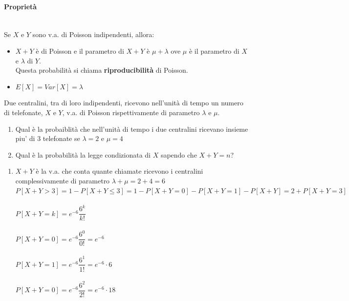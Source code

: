 \documentclass[12pt]{report}
\newcounter{exercise}
\begin{document}
  	 \paragraph{Proprietà} \quad \\
  	 Se $X$ e $Y$ sono v.a. di Poisson indipendenti, allora:
  	 \begin{itemize}
  	 	\item $X + Y$ è di Poisson e il parametro di $X + Y$ è $\mu + \lambda$ ove $\mu$ è il parametro di $X$ e $\lambda$ di $Y$. \\
  	 	Questa probabilità si chiama \textbf{riproducibilità} di Poisson.
  	 	\item $E[X] = Var[X] = \lambda$
  	 \end{itemize}
  	 \begin{exercise}{}{}
  	 	\begin{assignment}{}{}
  	 		Due centralini, tra di loro indipendenti, ricevono nell'unità di tempo un numero di telefonate, $X$ e $Y$, v.a. di Poisson rispettivamente di parametro $\lambda$ e $\mu$. \\
  	 		\begin{enumerate}
  	 			\item Qual è la probaiblità che nell'unità di tempo i due centralini ricevano insieme piu' di 3 telefonate se $\lambda = 2$ e $\mu = 4$
  	 			\item Qual è la probabilità la legge condizionata di $X$ sapendo che $X+Y=n$?
  	 		\end{enumerate}
  	 	\end{assignment}
  	 		\begin{enumerate}
  	 			\item $X + Y$ è la v.a. che conta quante chiamate ricevono i centralini complessivamente di parametro $\lambda + \mu = 2 + 4 = 6$ \\
  	 			$P[X + Y > 3] = 1 - P[X + Y \leq 3] = 1 - P[X + Y = 0] - P[X + Y = 1] - P[X + Y] = 2 + P[X + Y = 3]$ \\ \quad \\
  	 			$P[X+Y = k] = e^{-6}\dfrac{6^k}{k!}$ \\ \quad \\
  	 			$P[X+Y = 0] = e^{-6}\dfrac{6^0}{0!} = e^{-6}$\\ \quad \\
  	 			$P[X+Y = 1] = e^{-6}\dfrac{6^1}{1!} = e^{-6} \cdot 6$ \\ \quad \\
  	 			$P[X+Y = 0] = e^{-6}\dfrac{6^2}{2!} = e^{-6} \cdot 18$ \\ \quad \\

\end{enumerate}
\end{exercise}
\end{document}
